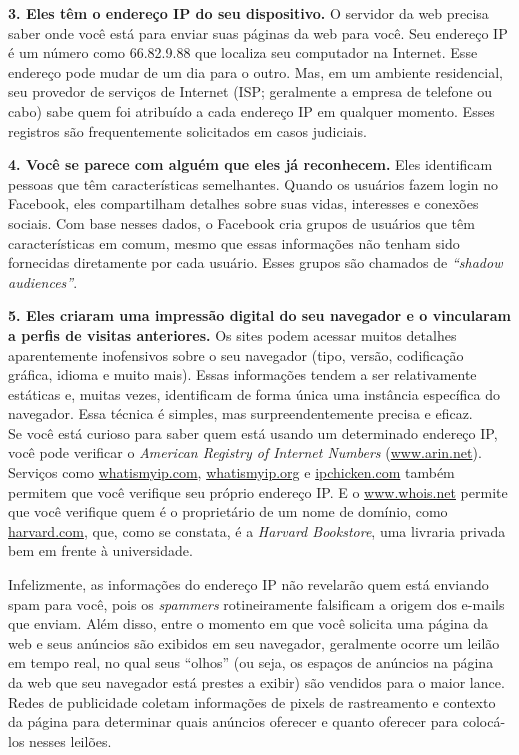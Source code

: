 \documentclass{book}
\newcommand{\ingles}[1]{\textit{#1}}
\begin{document}
\textbf{3. Eles têm o endereço IP do seu dispositivo.} O servidor da web precisa
saber onde você está para enviar suas páginas da web para você. Seu endereço IP
é um número como 66.82.9.88 que localiza seu computador na Internet. Esse
endereço pode mudar de um dia para o outro. Mas, em um ambiente residencial, seu
provedor de serviços de Internet (ISP; geralmente a empresa de telefone ou cabo)
sabe quem foi atribuído a cada endereço IP em qualquer momento. Esses registros
são frequentemente solicitados em casos judiciais.

\textbf{4. Você se parece com alguém que eles já reconhecem.} Eles identificam
pessoas que têm características semelhantes. Quando os usuários fazem login no
Facebook, eles compartilham detalhes sobre suas vidas, interesses e conexões
sociais. Com base nesses dados, o Facebook cria grupos de usuários que têm
características em comum, mesmo que essas informações não tenham sido fornecidas
diretamente por cada usuário. Esses grupos são chamados de \ingles{``shadow audiences''}.

\textbf{5. Eles criaram uma impressão digital do seu navegador e o vincularam a
perfis de visitas anteriores.} Os sites podem acessar muitos detalhes aparentemente
inofensivos sobre o seu navegador (tipo, versão, codificação gráfica, idioma e
muito mais). Essas informações tendem a ser relativamente estáticas e, muitas
vezes, identificam de forma única uma instância específica do navegador.
Essa técnica é simples, mas surpreendentemente precisa e eficaz.\\

Se você está curioso para saber quem está usando um determinado endereço IP, você
pode verificar o \ingles{American Registry of Internet Numbers} (\url{www.arin.net}).
Serviços como \url{whatismyip.com}, \url{whatismyip.org} e \url{ipchicken.com}
também permitem que você verifique seu próprio endereço IP. E o \url{www.whois.net}
permite que você verifique quem é o proprietário de um nome de domínio, como
\url{harvard.com}, que, como se constata, é a \ingles{Harvard Bookstore}, uma
livraria privada bem em frente à universidade.

Infelizmente, as informações do endereço IP não revelarão quem está enviando spam
para você, pois os \ingles{spammers} rotineiramente falsificam a origem dos
e-mails que enviam. Além disso, entre o momento em que você solicita uma página
da web e seus anúncios são exibidos em seu navegador, geralmente ocorre um leilão
em tempo real, no qual seus ``olhos'' (ou seja, os espaços de anúncios na página
da web que seu navegador está prestes a exibir) são vendidos para o maior lance.
Redes de publicidade coletam informações de pixels de rastreamento e contexto da
página para determinar quais anúncios oferecer e quanto oferecer para colocá-los
nesses leilões.
\end{document}
